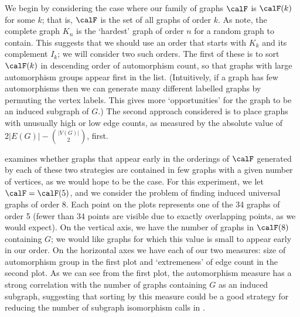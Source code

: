 We begin by considering the case where our family of graphs $\calF$
is $\calF(k)$ for some $k$; that is,
$\calF$ is the set of all graphs of order $k$.
As \cite{chatterjee2021isomorphisms} note, the complete
graph $K_n$ is the `hardest' graph of order $n$ for a random graph to contain.
This suggests
that we should use an order that starts with $K_k$ and its complement $I_k$;
we will consider two such orders.  The first of these is to sort $\calF(k)$ in descending
order of automorphism count, so that
graphs with large automorphism groups appear first in the list.  (Intuitively, if a graph
has few automorphisms then we can generate many different labelled graphs
by permuting the vertex labels.  This gives more `opportunities' for the
graph to be an induced subgraph of $G$.)
The second approach considered is to place graphs
with unusually high or low edge counts, as measured by the absolute value of
${2|E(G)| - {|V(G)| \choose 2}}$, first.

 examines whether graphs that appear early in the orderings
of $\calF$
generated by each of these two strategies are contained in few graphs with
a given number of vertices, as we would hope to be the case.
For this experiment, we let $\calF = \calF(5)$, and we consider the problem
of finding induced universal graphs of order 8.
Each point on the plots
represents one of the 34 graphs of order 5 (fewer than 34 points are visible
due to exactly overlapping points, as we would expect).  On the vertical
axis, we have the number of graphs in $\calF(8)$ containing $G$; we would like
graphs for which this value is small to appear early in our order.
On the horizontal axes we have each of our two measures: size of automorphism group
in the first plot and `extremeness' of edge count in the second plot.
As we can see from the first plot, the automorphism measure has a strong correlation
with the number of graphs containing $G$ as an induced subgraph, suggesting that
sorting by this measure could be a good strategy for reducing the number of
subgraph isomorphism calls in .

